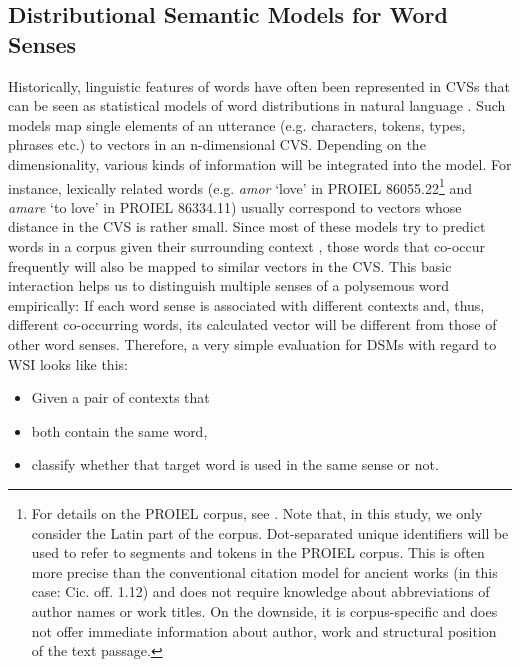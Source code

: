 \documentclass[runningheads]{llncs}
\begin{document}
\subsection{Distributional Semantic Models for Word Senses}
Historically, linguistic features of words have often been represented in \gls{CVS}s \parencites{mikolovEfficientEstimationWord2013}{daiDocumentEmbeddingParagraph2015}{akbikContextualStringEmbeddings2018} that can be seen as statistical models of word distributions in natural language \parencite[1140]{bengioNeuralProbabilisticLanguage2003}. Such models map single elements of an utterance (e.g. characters, tokens, types, phrases etc.) to vectors in an n-dimensional \gls{CVS}. Depending on the dimensionality, various kinds of information will be integrated into the model. For instance, lexically related words (e.g. \textit{amor} `love' in PROIEL 86055.22\footnote{For details on the PROIEL corpus, see \textcite{haugCreatingParallelTreebank2008}. Note that, in this study, we only consider the Latin part of the corpus. Dot-separated unique identifiers will be used to refer to segments and tokens in the PROIEL corpus. This is often more precise than the conventional citation model for ancient works (in this case: Cic. off. 1.12) and does not require knowledge about abbreviations of author names or work titles. On the downside, it is corpus-specific and does not offer immediate information about author, work and structural position of the text passage.} and \textit{amare} `to love' in PROIEL 86334.11) usually correspond to vectors whose distance in the \gls{CVS} is rather small. Since most of these models try to predict words in a corpus given their surrounding context \parencite[5]{mikolovEfficientEstimationWord2013}, those words that co-occur frequently will also be mapped to similar vectors in the \gls{CVS}. This basic interaction helps us to distinguish multiple senses of a polysemous word empirically: If each word sense is associated with different contexts and, thus, different co-occurring words, its calculated vector will be different from those of other word senses. Therefore, a very simple evaluation for \gls{DSM}s with regard to \gls{WSI} looks like this:
\begin{itemize}
	\item Given a pair of contexts that
	\item both contain the same word,
	\item classify whether that target word is used in the same sense or not.
\end{itemize}
\end{document}
